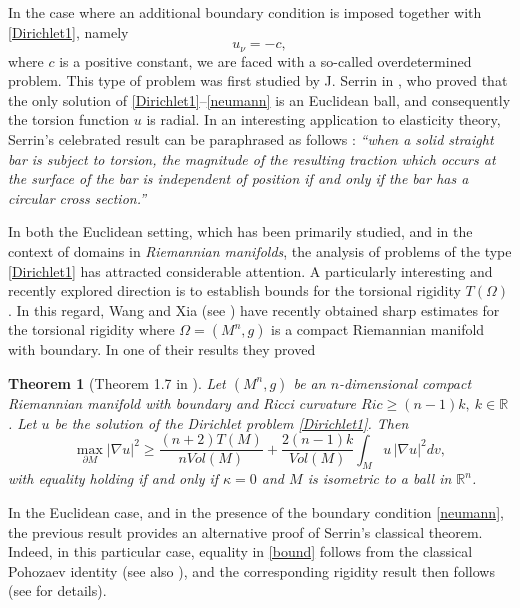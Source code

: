 \documentclass[reqno,11pt]{amsart}
\numberwithin{equation}{section}  %
\newtheorem{theorem}{Theorem}[section]
\begin{document}
In the case where an additional boundary condition is imposed together with \eqref{Dirichlet1}, namely
\begin{equation}\label{neumann}
u_{\nu} = -c,
\end{equation}
where $c$ is a positive constant, we are faced with a so-called overdetermined problem. This type of problem was first studied by J. Serrin in \cite{serrin1971}, who proved that the only solution of \eqref{Dirichlet1}--\eqref{neumann} is an Euclidean ball, and consequently the torsion function $u$ is radial. In an interesting application to elasticity theory, Serrin's celebrated result can be paraphrased as follows \cite{serrin1971}: \textit{``when a solid straight bar is subject to torsion, the magnitude of the resulting traction which occurs at the surface of the bar is independent of position if and only if the bar has a circular cross section.''}

In both the Euclidean setting, which has been primarily studied, and in the context of domains in \textit{Riemannian manifolds}, the analysis of problems of the type \eqref{Dirichlet1} has attracted considerable attention. A particularly interesting and recently explored direction is to establish bounds for the torsional rigidity $T(\Omega)$. In this regard, Wang and Xia (see \cite{wang2020}) have recently obtained sharp estimates for the torsional rigidity where $\Omega=(M^n,g)$ is a compact Riemannian manifold with boundary. In one of their results they proved 
\begin{theorem}[Theorem 1.7 in \cite{wang2020}]
Let $(M^n,g)$ be an $n$-dimensional compact Riemannian manifold with boundary and Ricci curvature $Ric\geq(n-1)k, \ k\in\mathbb{R}$. Let $u$ be the solution of the Dirichlet problem \eqref{Dirichlet1}.
Then
\begin{equation}\label{bound}
\max_{\partial M} |\nabla u|^2 
\geq 
\frac{(n+2)T(M)}{nVol(M)}
+ \frac{2(n-1)k}{Vol(M)} \int_M u\,|\nabla u|^2dv,
\end{equation}
with equality holding if and only if $\kappa = 0$ and $M$ is isometric to a ball in $\mathbb{R}^n$.
\end{theorem}    
In the Euclidean case, and in the presence of the boundary condition \eqref{neumann}, the previous result provides an alternative proof of Serrin's classical theorem. Indeed, in this particular case, equality in \eqref{bound} follows from the classical Pohozaev identity \cite{pohozaev1965} (see also \cite[p.~171]{struwe}), and the corresponding rigidity result then follows (see \cite{wang2020} for details). 
\end{document}
